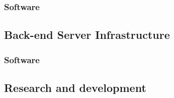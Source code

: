 \subsubsection{Software}

\subsection{Back-end Server Infrastructure}

\subsubsection{Software}

\subsection{Research and development}

